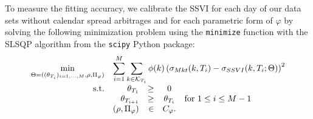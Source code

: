 To measure the fitting accuracy, we calibrate the SSVI for each day of our data sets without calendar spread arbitrages and for each parametric form of $\varphi$ by solving the following minimization problem using the \texttt{minimize} function with the SLSQP algorithm from the \texttt{scipy} Python package:
\begin{equation}\label{eq:ssvi_calibration}
    \begin{array}{rrrcllr}
    \displaystyle\min_{\Theta=((\theta_{T_i})_{i=1,\dots,M},\rho,\Pi_{\varphi})} & \multicolumn{5}{c}{\displaystyle\sum_{i=1}^M\sum_{k\in\mathcal{K}_{T_i}} \phi(k) \left(\sigma_{Mkt}(k,T_i) - \sigma_{SSVI}(k,T_i;\Theta)\right)^2 } \\
        \text{s.t.} & \theta_{T_1} & \ge & 0 & & \\
    &\theta_{T_{i+1}} &\ge &\theta_{T_i} & \text{for } 1\le i \le M-1 &  \\
    & (\rho,\Pi_{\varphi}) & \in & C_{\varphi}. &&
        \end{array}
\end{equation}


